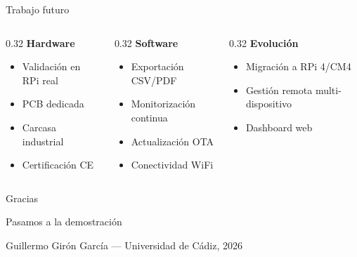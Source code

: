 \documentclass[aspectratio=169,11pt]{beamer}
\begin{document}
\begin{frame}{Trabajo futuro}

\begin{columns}[T]
\begin{column}{0.32\textwidth}
\textbf{Hardware}
\begin{itemize}
    \item Validación en RPi real
    \item PCB dedicada
    \item Carcasa industrial
    \item Certificación CE
\end{itemize}
\end{column}
\begin{column}{0.32\textwidth}
\textbf{Software}
\begin{itemize}
    \item Exportación CSV/PDF
    \item Monitorización continua
    \item Actualización OTA
    \item Conectividad WiFi
\end{itemize}
\end{column}
\begin{column}{0.32\textwidth}
\textbf{Evolución}
\begin{itemize}
    \item Migración a RPi 4/CM4
    \item Gestión remota multi-dispositivo
    \item Dashboard web
\end{itemize}
\end{column}
\end{columns}

\end{frame}

\begin{frame}{}
\begin{center}
\vspace{1cm}
{\Huge\textcolor{ucablue}{Gracias}}

\vspace{1cm}
{\large Pasamos a la demostración}

\vspace{1cm}
{\small Guillermo Girón García — Universidad de Cádiz, 2026}
\end{center}
\end{frame}
\end{document}
